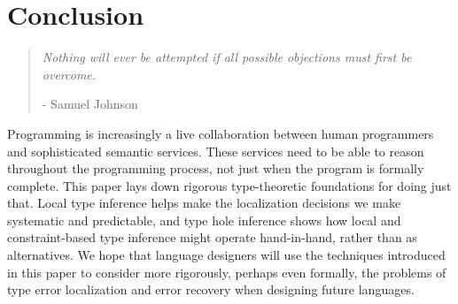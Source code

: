 \section{Conclusion}
\label{sec:conclusion}

\begin{quote}
    \emph{Nothing will ever be attempted if all possible objections must first be overcome.} 
    \begin{flushright}- Samuel Johnson\end{flushright}
\end{quote}

Programming is increasingly a live collaboration between human programmers and sophisticated semantic services. 
These services need to be able to reason throughout the programming process, not just when the program is formally complete. This paper lays down rigorous type-theoretic foundations for doing just that. Local type inference helps make the localization decisions we make systematic and predictable, and type hole inference shows how local and constraint-based type inference might operate hand-in-hand, rather than as alternatives. 
We hope that language designers will use the techniques introduced in this paper to consider more rigorously, perhaps even formally, the problems of type error localization and error recovery when designing future languages. 


